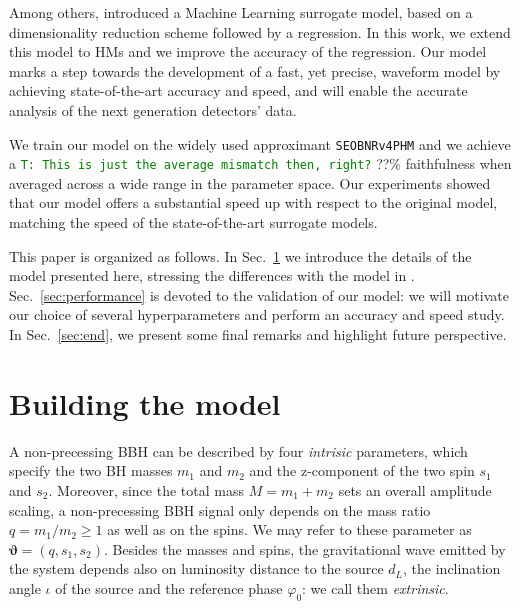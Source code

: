 \documentclass[twocolumn,showpacs,preprintnumbers,nofootinbib,prd,
superscriptaddress,10pt]{revtex4-1}
\newcommand{\tim}[1]{{\textcolor{green}{\texttt{T: #1}} }}
\begin{document}
Among others, \cite{Schmidt:2020yuu} introduced a Machine Learning surrogate model, based on a dimensionality reduction scheme followed by a regression. In this work, we extend this model to HMs and we improve the accuracy of the regression. Our model marks a step towards the development of a fast, yet precise, waveform model by achieving state-of-the-art accuracy and speed, and will enable the accurate analysis of the next generation detectors' data.

We train our model on the widely used approximant \texttt{SEOBNRv4PHM} and we achieve a \tim{This is just the average mismatch then, right?} ??\% faithfulness when averaged across a wide range in the parameter space.
Our experiments showed that our model offers a substantial speed up with respect to the original model, matching the speed of the state-of-the-art surrogate models.

This paper is organized as follows. In Sec.~\ref{sec:model} we introduce the details of the model presented here, stressing the differences with the model in  \cite{Schmidt:2020yuu}.
Sec.~\ref{sec:performance} is devoted to the validation of our model: we will motivate our choice of several hyperparameters and perform an accuracy and speed study.
In Sec.~\ref{sec:end}, we present some final remarks and highlight future perspective.

\section{Building the model}
\label{sec:model}

A non-precessing BBH can be described by four {\it intrisic} parameters, which specify the two BH masses $m_1$ and $m_2$ and the z-component of the two spin $s_1$ and $s_2$.
Moreover, since the total mass $M = m_1 + m_2$ sets an overall amplitude scaling, a non-precessing BBH signal only depends on the mass ratio $q = m_1/m_2 \geq 1$ as well as on the spins. We may refer to these parameter as $\boldsymbol{\vartheta} = (q, s_1, s_2)$.
Besides the masses and spins, the gravitational wave emitted by the system depends also on luminosity distance to the source $d_L$, the inclination angle $\iota$ of the source and the reference phase $\varphi_0$: we call them {\it extrinsic}.
\end{document}
